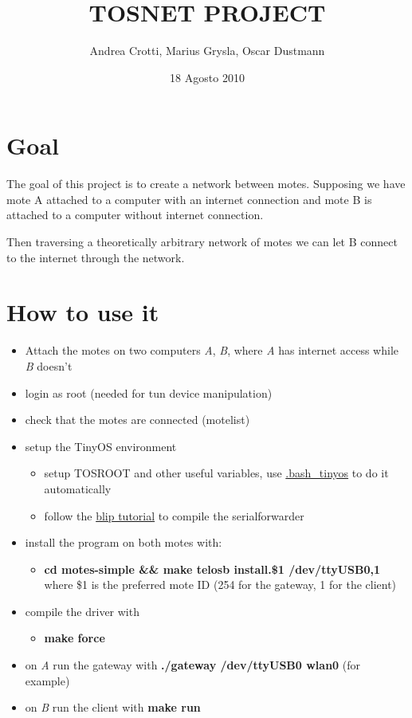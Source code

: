 \documentclass[11pt]{article}
\title{TOSNET PROJECT}
\author{Andrea Crotti, Marius Grysla, Oscar Dustmann}
\date{18 Agosto 2010}
\begin{document}
\maketitle


\section*{Goal}
\label{sec-1}

  The goal of this project is to create a network between motes.
  Supposing we have mote A attached to a computer with an internet connection and mote B is attached to a computer without internet connection.

  Then traversing a theoretically arbitrary network of motes we can let B connect to the internet through the network.
\section*{How to use it}
\label{sec-2}

\begin{itemize}
\item Attach the motes on two computers \emph{A}, \emph{B}, where \emph{A} has internet access while \emph{B} doesn't
\item login as root (needed for tun device manipulation)
\item check that the motes are connected (motelist)
\item setup the TinyOS environment

\begin{itemize}
\item setup TOSROOT and other useful variables, use \href{http://www.5secondfuse.com/tinyos/.bash_tinyos}{.bash\_tinyos} to do it automatically
\item follow the \href{http://docs.tinyos.net/index.php/BLIP_Tutorial}{blip tutorial} to compile the serialforwarder
\end{itemize}

\item install the program on both motes with:

\begin{itemize}
\item \textbf{cd motes-simple \&\& make telosb install.\$1 /dev/ttyUSB0,1}
      where \$1 is the preferred mote ID (254 for the gateway, 1 for the client)
\end{itemize}

\item compile the driver with

\begin{itemize}
\item \textbf{make force}
\end{itemize}

\item on \emph{A} run the gateway with \textbf{./gateway /dev/ttyUSB0 wlan0} (for example)
\item on \emph{B} run the client with \textbf{make run}
\end{itemize}
\end{document}
